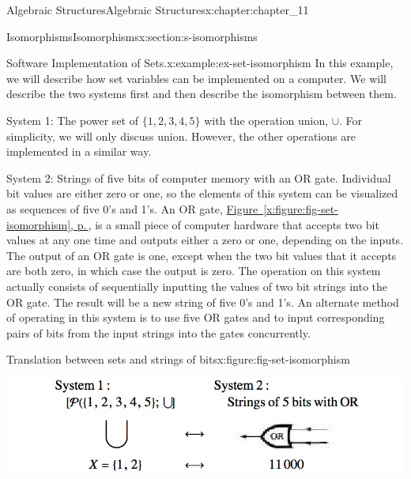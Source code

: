 \documentclass[twoside,10pt,]{book}
\newcommand{\xreffont}{\relax}
\numberwithin{equation}{section}
\begin{document}
\begin{chapterptx}{Algebraic Structures}{}{Algebraic Structures}{}{}{x:chapter:chapter_11}
\begin{sectionptx}{Isomorphisms}{}{Isomorphisms}{}{}{x:section:s-isomorphisms}
\begin{introduction}{}
\begin{example}{Software Implementation of Sets.}{x:example:ex-set-isomorphism}%
In this example, we will describe how set  variables can be implemented on a computer. We will describe the two systems first and then describe the isomorphism between them.%
\par
System 1: The power set of \(\{1, 2, 3, 4, 5\}\) with the operation union, \(\cup\). For simplicity, we will only discuss union. However, the other operations are implemented in a similar way.%
\par
System 2: Strings of five bits of computer memory with an OR gate. Individual bit values are either zero or one, so the elements of this system can be visualized as sequences of five 0's and 1's. An OR gate, \hyperref[x:figure:fig-set-isomorphism]{Figure~{\xreffont\ref{x:figure:fig-set-isomorphism}}, p.\,\pageref{x:figure:fig-set-isomorphism}}, is a small piece of computer hardware that accepts two bit values at any one time and outputs either a zero or one, depending on the inputs. The output of an OR gate is one, except when the two bit values that it accepts are both zero, in which case the output is zero. The operation on this system actually consists of sequentially inputting the values of two bit strings into the OR gate. The result will be a new string of five 0's and 1's. An alternate method of operating in this system is to use five OR gates and to input corresponding pairs of bits from the input strings into the gates concurrently.%
\begin{figureptx}{Translation between sets and strings of bits}{x:figure:fig-set-isomorphism}{}%
\begin{image}{0.15}{0.7}{0.15}%
\includegraphics[width=\linewidth]{images/fig-set-isomorphism.png}
\end{image}%
\tcblower
\end{figureptx}%

\end{example}
\end{introduction}
\end{sectionptx}
\end{chapterptx}
\end{document}
